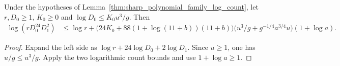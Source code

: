 \begin{lemma}
    \label{thm:sharp_approximation_log_rank_budget}
    \leanok
    Under the hypotheses of Lemma~\ref{thm:sharp_polynomial_family_log_count},
    let $r,D_0\ge1$, $K_0\ge0$ and $\log D_0\le K_0u^3/g$.
    Then
    \begin{align}
        \log(rD_0^{24}D_1^2)
         & \le\log r+
        \bigl(24K_0+88(1+\log(11+b))(11+b)\bigr)
        \bigl(u^3/g+g^{-1/4}a^{3/4}u\bigr)(1+\log a).
        \label{eq:sharp_log_rank_budget}
    \end{align}
\end{lemma}
\begin{proof}
    \leanok
    Expand the left side as $\log r+24\log D_0+2\log D_1$.
    Since $u\ge1$, one has $u/g\le u^3/g$.
    Apply the two logarithmic count bounds and use $1+\log a\ge1$.
\end{proof}

